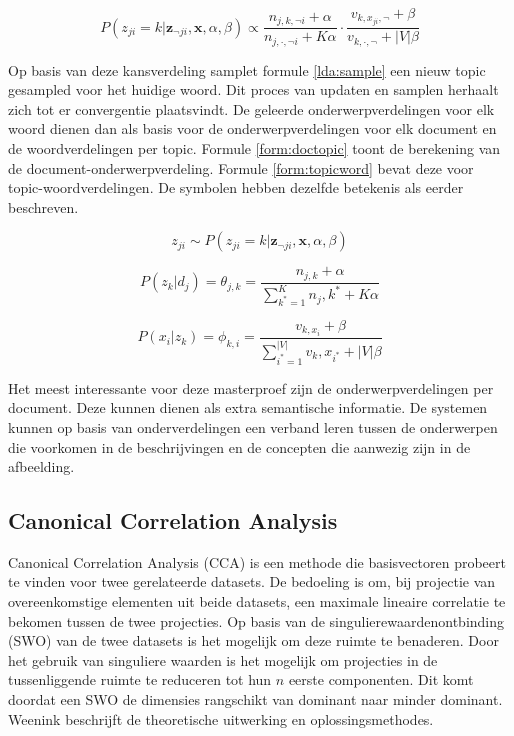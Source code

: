 \begin{equation}
    P(z_{ji} = k | \mathbf{z}_{\neg ji}, \mathbf{x}, \alpha, \beta) \propto \frac{n_{j,k,\neg i} + \alpha}{n_{j, \cdot, \neg i} + K \alpha} \cdot \frac{v_{k,x_{ji}, \neg}+ \beta}{v_{k,\cdot,\neg} + |V|\beta}
    \label{lda:update}
\end{equation}

Op basis van deze kansverdeling samplet formule \eqref{lda:sample} een nieuw topic gesampled voor het huidige woord. Dit proces van updaten en samplen herhaalt zich tot er convergentie plaatsvindt. De geleerde onderwerpverdelingen voor elk woord dienen dan als basis voor de onderwerpverdelingen voor elk document en de woordverdelingen per topic. Formule \eqref{form:doctopic} toont de berekening van de document-onderwerpverdeling. Formule \eqref{form:topicword} bevat deze voor topic-woordverdelingen. De symbolen hebben dezelfde betekenis als eerder beschreven.

\begin{equation}
    z_{ji} \sim  P(z_{ji} = k | \mathbf{z}_{\neg ji}, \mathbf{x}, \alpha, \beta)
    \label{lda:sample}
\end{equation}

\begin{equation}
    P(z_k|d_j) = \theta_{j,k} = \frac{n_{j,k} + \alpha}{\sum_{k^*=1}^K n_j,k^* + K\alpha}
    \label{form:doctopic}
\end{equation}

\begin{equation}
    P(x_i|z_k) = \phi_{k,i} = \frac{v_{k,x_i} + \beta}{\sum_{i^*=1}^{|V|} v_k,x_{i^*} + |V|\beta}
    \label{form:topicword}
\end{equation}

Het meest interessante voor deze masterproef zijn de onderwerpverdelingen per document. Deze kunnen dienen als extra semantische informatie. De systemen kunnen op basis van onderverdelingen een verband leren tussen de onderwerpen die voorkomen in de beschrijvingen en de concepten die aanwezig zijn in de afbeelding. 


\subsection{Canonical Correlation Analysis}
\label{sub:stackedcca}         
Canonical Correlation Analysis (CCA) is een methode die basisvectoren probeert te vinden voor twee gerelateerde datasets. De bedoeling is om, bij projectie van overeenkomstige elementen uit beide datasets, een maximale lineaire correlatie te bekomen tussen de twee projecties. 
Op basis van de singulierewaardenontbinding (SWO) van de twee datasets is het mogelijk om deze ruimte te benaderen. Door het gebruik van singuliere waarden is het mogelijk om projecties in de tussenliggende ruimte te reduceren tot hun $n$ eerste componenten. Dit komt doordat een SWO de dimensies rangschikt van dominant naar minder dominant. Weenink\cite{Weenink2003} beschrijft de theoretische uitwerking en oplossingsmethodes.

